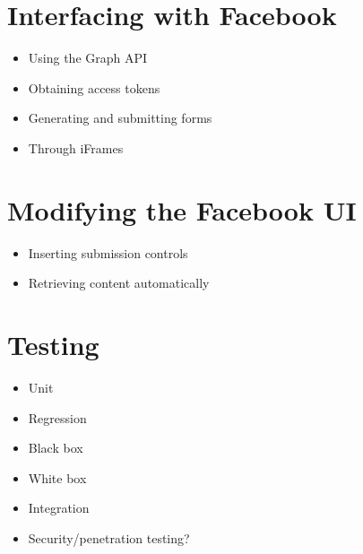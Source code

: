 
\section{Interfacing with Facebook}
    \begin{itemize}
        \item Using the Graph API
        \item Obtaining access tokens
        \item Generating and submitting forms
        \item Through iFrames
    \end{itemize}

\section{Modifying the Facebook UI}
    \begin{itemize}
        \item Inserting submission controls
        \item Retrieving content automatically
    \end{itemize}

\section{Testing}
    \begin{itemize}
        \item Unit
        \item Regression
        \item Black box
        \item White box
        \item Integration
        \item Security/penetration testing?
    \end{itemize}

